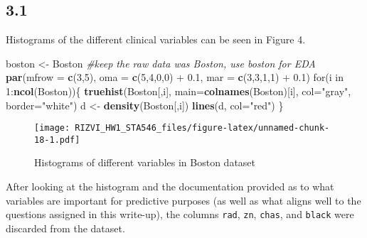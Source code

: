 \documentclass[]{article}
\newenvironment{Shaded}{\begin{snugshade}}{\end{snugshade}}
\newcommand{\KeywordTok}[1]{\textcolor[rgb]{0.13,0.29,0.53}{\textbf{{#1}}}}
\newcommand{\DataTypeTok}[1]{\textcolor[rgb]{0.13,0.29,0.53}{{#1}}}
\newcommand{\DecValTok}[1]{\textcolor[rgb]{0.00,0.00,0.81}{{#1}}}
\newcommand{\FloatTok}[1]{\textcolor[rgb]{0.00,0.00,0.81}{{#1}}}
\newcommand{\StringTok}[1]{\textcolor[rgb]{0.31,0.60,0.02}{{#1}}}
\newcommand{\CommentTok}[1]{\textcolor[rgb]{0.56,0.35,0.01}{\textit{{#1}}}}
\newcommand{\NormalTok}[1]{{#1}}
\begin{document}
\subsection{3.1}\label{section-3}

Histograms of the different clinical variables can be seen in Figure 4.

\begin{Shaded}
\begin{Highlighting}[]
\NormalTok{boston <-}\StringTok{ }\NormalTok{Boston }\CommentTok{#keep the raw data was Boston, use boston for EDA}
\KeywordTok{par}\NormalTok{(}\DataTypeTok{mfrow =} \KeywordTok{c}\NormalTok{(}\DecValTok{3}\NormalTok{,}\DecValTok{5}\NormalTok{),}
          \DataTypeTok{oma =} \KeywordTok{c}\NormalTok{(}\DecValTok{5}\NormalTok{,}\DecValTok{4}\NormalTok{,}\DecValTok{0}\NormalTok{,}\DecValTok{0}\NormalTok{) +}\StringTok{ }\FloatTok{0.1}\NormalTok{,}
          \DataTypeTok{mar =} \KeywordTok{c}\NormalTok{(}\DecValTok{3}\NormalTok{,}\DecValTok{3}\NormalTok{,}\DecValTok{1}\NormalTok{,}\DecValTok{1}\NormalTok{) +}\StringTok{ }\FloatTok{0.1}\NormalTok{)}
\NormalTok{for(i in }\DecValTok{1}\NormalTok{:}\KeywordTok{ncol}\NormalTok{(Boston))\{}
        \KeywordTok{truehist}\NormalTok{(Boston[,i], }\DataTypeTok{main=}\KeywordTok{colnames}\NormalTok{(Boston)[i], }\DataTypeTok{col=}\StringTok{"gray"}\NormalTok{, }\DataTypeTok{border=}\StringTok{"white"}\NormalTok{)}
        \NormalTok{d <-}\StringTok{ }\KeywordTok{density}\NormalTok{(Boston[,i])}
        \KeywordTok{lines}\NormalTok{(d, }\DataTypeTok{col=}\StringTok{"red"}\NormalTok{)}
\NormalTok{\}}
\end{Highlighting}
\end{Shaded}

\begin{figure}[htbp]
\centering
\texttt{[image: RIZVI\_HW1\_STA546\_files/figure-latex/unnamed-chunk-18-1.pdf]}
\caption{Histograms of different variables in Boston dataset}
\end{figure}

After looking at the histogram and the documentation provided as to what
variables are important for predictive purposes (as well as what aligns
well to the questions assigned in this write-up), the columns
\texttt{rad}, \texttt{zn}, \texttt{chas}, and \texttt{black} were
discarded from the dataset.

\begin{Shaded}
\end{Shaded}
\end{document}
